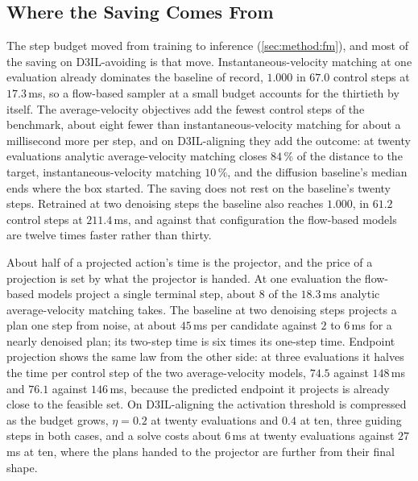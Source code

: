 \subsection{Where the Saving Comes From}\label{sec:disc:saving}

The step budget moved from training to inference (\autoref{sec:method:fm}), and most of the saving on
D3IL-avoiding is that move. Instantaneous-velocity matching at one evaluation already dominates the
baseline of record, $1.000$ in $67.0$ control steps at $17.3$\,ms, so a flow-based sampler at a small
budget accounts for the thirtieth by itself. The average-velocity objectives add the fewest control
steps of the benchmark, about eight fewer than instantaneous-velocity matching for about a
millisecond more per step, and on D3IL-aligning they add the outcome: at twenty evaluations analytic
average-velocity matching closes $84\,\%$ of the distance to the target, instantaneous-velocity
matching $10\,\%$, and the diffusion baseline's median ends where the box started. The saving does not
rest on the baseline's twenty steps. Retrained at two denoising steps the baseline also reaches
$1.000$, in $61.2$ control steps at $211.4$\,ms, and against that configuration the flow-based models
are twelve times faster rather than thirty.

About half of a projected action's time is the projector, and the price of a projection is set by
what the projector is handed. At one evaluation the flow-based models project a single terminal step,
about $8$ of the $18.3$\,ms analytic average-velocity matching takes. The baseline at two denoising
steps projects a plan one step from noise, at about $45$\,ms per candidate against $2$ to $6$\,ms for
a nearly denoised plan; its two-step time is six times its one-step time. Endpoint
projection shows the same law from the other side: at three evaluations it halves the time per control
step of the two average-velocity models, $74.5$ against $148$\,ms and $76.1$ against $146$\,ms, because
the predicted endpoint it projects is already close to the feasible set. On D3IL-aligning the
activation threshold is compressed as the budget grows, $\eta = 0.2$ at twenty evaluations and $0.4$
at ten, three guiding steps in both cases, and a solve costs about $6$\,ms at twenty evaluations
against $27$\,ms at ten, where the plans handed to the projector are further from their final shape.

